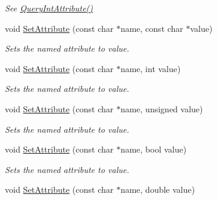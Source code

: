 \begin{DoxyCompactItemize}
\begin{DoxyCompactList}\small\item\em See \hyperlink{classtinyxml2_1_1_x_m_l_element_ab24fa0ee32441762191a47ee110975d5}{Query\-Int\-Attribute()} \end{DoxyCompactList}\item 
\hypertarget{classtinyxml2_1_1_x_m_l_element_a369a261d8005ab041b0a762c734c16b6}{void \hyperlink{classtinyxml2_1_1_x_m_l_element_a369a261d8005ab041b0a762c734c16b6}{Set\-Attribute} (const char $\ast$name, const char $\ast$value)}\label{classtinyxml2_1_1_x_m_l_element_a369a261d8005ab041b0a762c734c16b6}

\begin{DoxyCompactList}\small\item\em Sets the named attribute to value. \end{DoxyCompactList}\item 
\hypertarget{classtinyxml2_1_1_x_m_l_element_ade4fa1e18b3bf96da49e249d03f63c90}{void \hyperlink{classtinyxml2_1_1_x_m_l_element_ade4fa1e18b3bf96da49e249d03f63c90}{Set\-Attribute} (const char $\ast$name, int value)}\label{classtinyxml2_1_1_x_m_l_element_ade4fa1e18b3bf96da49e249d03f63c90}

\begin{DoxyCompactList}\small\item\em Sets the named attribute to value. \end{DoxyCompactList}\item 
\hypertarget{classtinyxml2_1_1_x_m_l_element_ae9162b2690e96d09eb6bb7dd8f55b522}{void \hyperlink{classtinyxml2_1_1_x_m_l_element_ae9162b2690e96d09eb6bb7dd8f55b522}{Set\-Attribute} (const char $\ast$name, unsigned value)}\label{classtinyxml2_1_1_x_m_l_element_ae9162b2690e96d09eb6bb7dd8f55b522}

\begin{DoxyCompactList}\small\item\em Sets the named attribute to value. \end{DoxyCompactList}\item 
\hypertarget{classtinyxml2_1_1_x_m_l_element_a3986d897f3fbfcb875cc68dd3a7958d1}{void \hyperlink{classtinyxml2_1_1_x_m_l_element_a3986d897f3fbfcb875cc68dd3a7958d1}{Set\-Attribute} (const char $\ast$name, bool value)}\label{classtinyxml2_1_1_x_m_l_element_a3986d897f3fbfcb875cc68dd3a7958d1}

\begin{DoxyCompactList}\small\item\em Sets the named attribute to value. \end{DoxyCompactList}\item 
\hypertarget{classtinyxml2_1_1_x_m_l_element_a72aa409cd26c0ccf168f9716d224fa00}{void \hyperlink{classtinyxml2_1_1_x_m_l_element_a72aa409cd26c0ccf168f9716d224fa00}{Set\-Attribute} (const char $\ast$name, double value)}\label{classtinyxml2_1_1_x_m_l_element_a72aa409cd26c0ccf168f9716d224fa00}


\end{DoxyCompactItemize}
